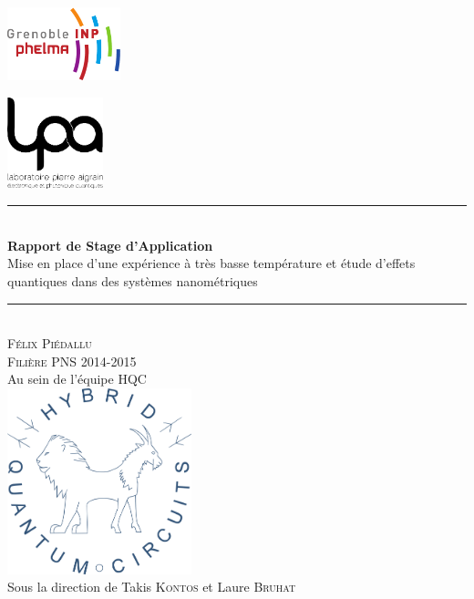 \begin{titlepage}
    \vspace*{-10px}
    \includegraphics[height=80px]{Images/logo_phelma.pdf}
    \vspace*{-80px}
\begin{flushright}
    \vspace*{-30px}
    \includegraphics[height=100px]{Images/logo_lpa.png}
\end{flushright}

\vspace*{0.5cm}
\begin{center}
\rule{\linewidth}{0.5mm}\\[0.4cm]
{\huge{\bfseries Rapport de Stage d'Application}\\[0.4cm]
Mise en place d'une expérience à très basse température et étude d'effets quantiques dans des systèmes nanométriques\\[0.4cm]}
\rule{\linewidth}{0.5mm}\\[0.5cm]

\LARGE{\textsc{Félix Piédallu}}\\[0.7cm]
\large{\textsc{Filière PNS 2014-2015}}\\[2cm]

\Large{Au sein de l'équipe HQC}\\[1cm]
\includegraphics[width=0.4\textwidth]{Images/logo_HQC.pdf}\\[1cm]

\large{Sous la direction de Takis \textsc{Kontos} et Laure \textsc{Bruhat}}\\[2cm]


\end{center}
\end{titlepage}

\tableofcontents        %
\newpage
{}  %
